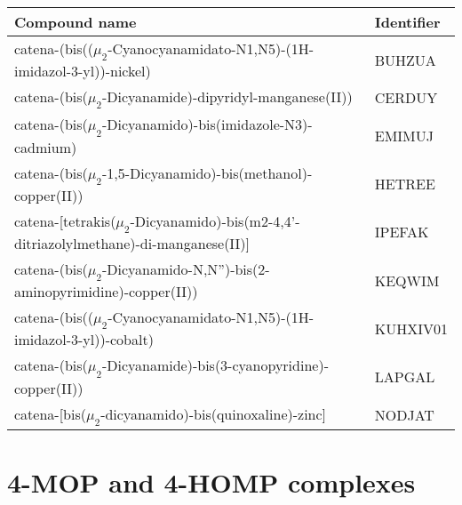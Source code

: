 \begin{table}[htpb!]
\centering
{}
\begin{tabular}{|p{10cm}|l|}
\hline
Compound name &  Identifier\\
\hline
catena-(bis(($\mu_2$-Cyanocyanamidato-N1,N5)-(1H-imidazol-3-yl))-nickel) \cite{buhzua} & BUHZUA\\
\hline
catena-(bis($\mu_2$-Dicyanamide)-dipyridyl-manganese(II)) \cite{cerduy} & CERDUY\\
\hline
catena-(bis($\mu_2$-Dicyanamido)-bis(imidazole-N3)-cadmium) \cite{emimuj} & EMIMUJ\\
\hline
catena-(bis($\mu_2$-1,5-Dicyanamido)-bis(methanol)-copper(II)) \cite{hetree} & HETREE\\
\hline
catena-[tetrakis($\mu_2$-Dicyanamido)-bis(m2-4,4'-ditriazolylmethane)-di-manganese(II)] \cite{ipefak} & IPEFAK\\
\hline
catena-(bis($\mu_2$-Dicyanamido-N,N'')-bis(2-aminopyrimidine)-copper(II)) \cite{keqwim} & KEQWIM\\
\hline
catena-(bis(($\mu_2$-Cyanocyanamidato-N1,N5)-(1H-imidazol-3-yl))-cobalt) \cite{kuhxiv01} & KUHXIV01\\
\hline
catena-(bis($\mu_2$-Dicyanamide)-bis(3-cyanopyridine)-copper(II)) \cite{lapgal} & LAPGAL\\
\hline
catena-[bis($\mu_2$-dicyanamido)-bis(quinoxaline)-zinc] \cite{nodjat} & NODJAT\\
\hline
\end{tabular}
\label{tab:dcacomp}
\end{table}



\section{4-MOP  and 4-HOMP complexes}



